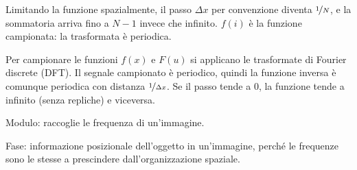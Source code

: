 Limitando la funzione spazialmente, il passo $\Delta x$ per convenzione diventa $\nicefrac{1}{N}$, e la sommatoria arriva fino a $N - 1$ invece che infinito. $f(i)$ è la funzione campionata: la trasformata è periodica. 

Per campionare le funzioni $f(x)$ e $F(u)$ si applicano le trasformate di Fourier discrete (DFT). Il segnale campionato è periodico, quindi la funzione inversa è comunque periodica con distanza $\nicefrac{1}{\Delta x}$. Se il passo tende a 0, la funzione tende a infinito (senza repliche) e viceversa. 

Modulo: raccoglie le frequenza di un'immagine.

Fase: informazione posizionale dell'oggetto in un'immagine, perché le frequenze sono le stesse a prescindere dall'organizzazione spaziale. 